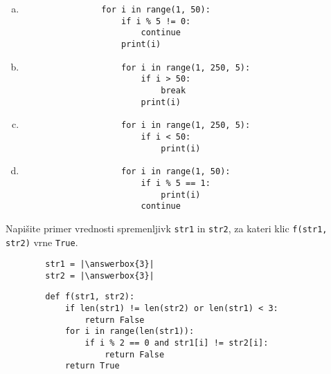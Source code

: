 \documentclass[arhiv, 10pt]{../izpit}
\newcommand{\inlinepy}[1]{\texttt{#1}}
\newcommand{\answerbox}[1]{\framebox{\vphantom{\large M}\hspace{#1cm}}}
\begin{document}
        \begin{multicols}{2}
        \begin{enumerate}[(a)]
\item 
            \begin{verbatim}
                for i in range(1, 50):
                    if i % 5 != 0:
                        continue
                    print(i)
            \end{verbatim}
        
\item 
                \begin{verbatim}
                    for i in range(1, 250, 5):
                        if i > 50:
                            break
                        print(i)
                \end{verbatim}
            
\item 
                \begin{verbatim}
                    for i in range(1, 250, 5):
                        if i < 50:
                            print(i)
                \end{verbatim}
            
\item 
                \begin{verbatim}
                    for i in range(1, 50):
                        if i % 5 == 1:
                            print(i)
                        continue
                \end{verbatim}
            
\end{enumerate}

        \end{multicols}
    
        \naloga*
        \begin{multicols}{2}
        \noindent
        Napišite primer vrednosti spremenljivk \inlinepy{str1} in \inlinepy{str2}, za kateri klic \inlinepy{f(str1, str2)} vrne \inlinepy{True}.
        \begin{verbatim}
        str1 = |\answerbox{3}|
        str2 = |\answerbox{3}|
        \end{verbatim}
        \vfil
        \columnbreak
        \begin{verbatim}
        def f(str1, str2):
            if len(str1) != len(str2) or len(str1) < 3:
                return False
            for i in range(len(str1)):
                if i % 2 == 0 and str1[i] != str2[i]:
                    return False
            return True
        \end{verbatim}
        \end{multicols}
    
\end{document}
